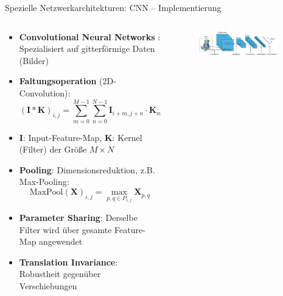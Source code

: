 \documentclass[aspectratio=1610, xcolor=dvipsnames, 9pt]{beamer}
\begin{document}
      \begin{frame}{Spezielle Netzwerkarchitekturen: CNN -- Implementierung}
        \begin{columns}
          \begin{column}{0.6\textwidth}
            \begin{itemize}
              \item \textbf{Convolutional Neural Networks} \cite{lecun1998}: Spezialisiert auf gitterförmige Daten (Bilder) \newline
              \item \textbf{Faltungsoperation} (2D-Convolution):
              \begin{equation}
                (\mathbf{I} * \mathbf{K})_{i,j} = \sum_{m=0}^{M-1} \sum_{n=0}^{N-1} \mathbf{I}_{i+m,j+n} \cdot \mathbf{K}_{m,n}
              \end{equation}
              \item $\mathbf{I}$: Input-Feature-Map, $\mathbf{K}$: Kernel (Filter) der Größe $M \times N$ \newline
              \item \textbf{Pooling}: Dimensionsreduktion, z.B. Max-Pooling:
              \begin{equation}
                \text{MaxPool}(\mathbf{X})_{i,j} = \max_{p,q \in P_{i,j}} \mathbf{X}_{p,q}
              \end{equation}
              \item \textbf{Parameter Sharing}: Derselbe Filter wird über gesamte Feature-Map angewendet
              \item \textbf{Translation Invariance}: Robustheit gegenüber Verschiebungen
            \end{itemize}
          \end{column}
           \begin{column}{0.4\textwidth}
             \begin{figure}
               \centering
                           \includegraphics[width=0.9\textwidth]{images/CNN.png}
               \end{figure}
               \begin{figure}

\end{figure}
\end{column}
\end{columns}
\end{frame}
\end{document}
